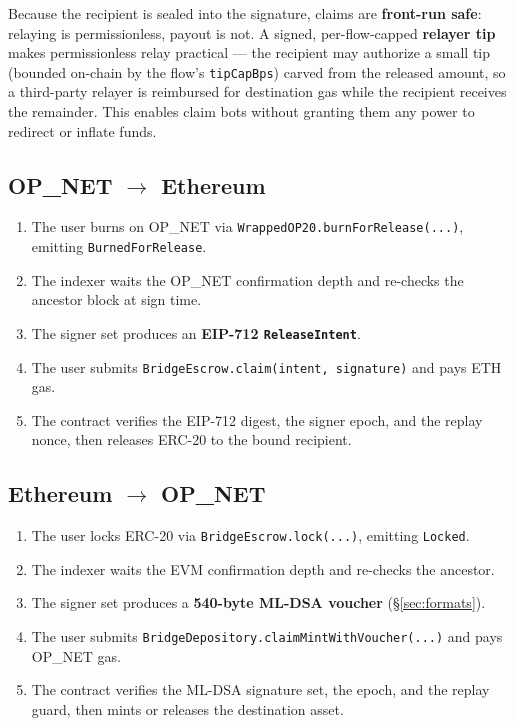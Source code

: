 \documentclass[11pt,a4paper]{article}
\begin{document}
Because the recipient is sealed into the signature, claims are \textbf{front-run safe}: relaying is permissionless, payout is not. A signed, per-flow-capped \textbf{relayer tip} makes permissionless relay practical --- the recipient may authorize a small tip (bounded on-chain by the flow's \texttt{tipCapBps}) carved from the released amount, so a third-party relayer is reimbursed for destination gas while the recipient receives the remainder. This enables claim bots without granting them any power to redirect or inflate funds.

\subsection{OP\_NET $\rightarrow$ Ethereum}

\begin{enumerate}
  \item The user burns on OP\_NET via \texttt{WrappedOP20.burnForRelease(...)}, emitting \texttt{BurnedForRelease}.
  \item The indexer waits the OP\_NET confirmation depth and re-checks the ancestor block at sign time.
  \item The signer set produces an \textbf{EIP-712 \texttt{ReleaseIntent}}.
  \item The user submits \texttt{BridgeEscrow.claim(intent, signature)} and pays ETH gas.
  \item The contract verifies the EIP-712 digest, the signer epoch, and the replay nonce, then releases ERC-20 to the bound recipient.
\end{enumerate}

\subsection{Ethereum $\rightarrow$ OP\_NET}

\begin{enumerate}
  \item The user locks ERC-20 via \texttt{BridgeEscrow.lock(...)}, emitting \texttt{Locked}.
  \item The indexer waits the EVM confirmation depth and re-checks the ancestor.
  \item The signer set produces a \textbf{540-byte ML-DSA voucher} (\S\ref{sec:formats}).
  \item The user submits \texttt{BridgeDepository.claimMintWithVoucher(...)} and pays OP\_NET gas.
  \item The contract verifies the ML-DSA signature set, the epoch, and the replay guard, then mints or releases the destination asset.
\end{enumerate}
\end{document}
